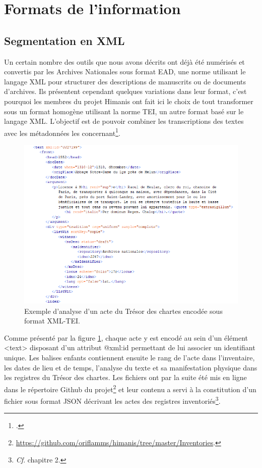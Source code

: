 \documentclass[a4paper,12pt,twoside]{book}
\begin{document}
	\section{Formats de l’information}
	
	\subsection{Segmentation en XML}
	
	Un certain nombre des outils que nous avons décrits ont déjà été numérisés et convertis par les Archives Nationales sous format EAD, une norme utilisant le langage XML pour structurer des descriptions de manuscrits ou de documents d’archives. Ils présentent cependant quelques variations dans leur format, c'est pourquoi les membres du projet Himanis ont fait ici le choix de tout transformer sous un format homogène utilisant la norme TEI, un autre format basé sur le langage XML. L'objectif est de pouvoir combiner les transcriptions des textes avec les métadonnées les concernant\footcite{stutzmann_recherche_2017}.
	
	\begin{figure}
		\centering
		\includegraphics[width=\textwidth]{Images/Inventaire_en_TEI.png}
		\caption{Exemple d'analyse d'un acte du Trésor des chartes encodée sous format XML-TEI.}
		\label{inventaire_TEI}
	\end{figure} 
	
	Comme présenté par la figure \ref{inventaire_TEI}, chaque acte y est encodé au sein d'un élément <text> disposant d'un attribut @xml:id permettant de lui associer un identifiant unique. Les balises enfants contiennent ensuite le rang de l'acte dans l'inventaire, les dates de lieu et de temps, l'analyse du texte et sa manifestation physique dans les registres du Trésor des chartes. Les fichiers ont par la suite été mis en ligne dans le répertoire Github du projet\footnote{\url{https://github.com/oriflamms/himanis/tree/master/Inventories}.} et leur contenu a servi à la constitution d'un fichier sous format JSON décrivant les actes des registres inventoriés\footnote{\textit{Cf}. chapitre 2.}.
	
\end{document}
